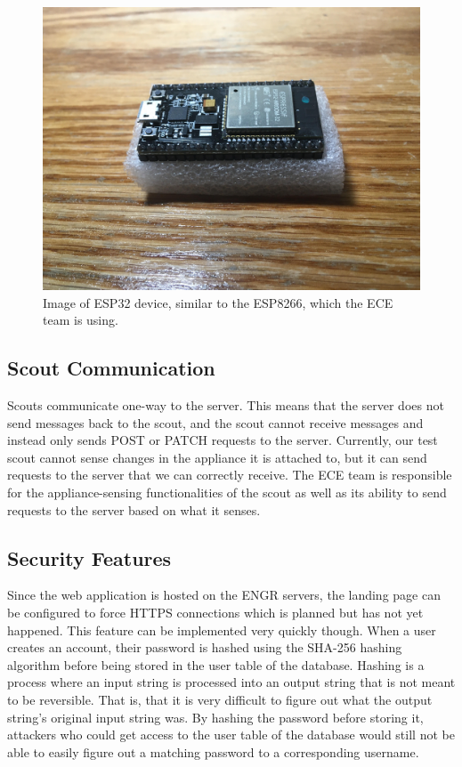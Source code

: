 \documentclass[onecolumn, draftclsnofoot,10pt, compsoc]{IEEEtran}
\begin{document}
\begin{figure}
    \centering
    \includegraphics[width = \textwidth]{unnamed.jpg}
    \caption{Image of ESP32 device, similar to the ESP8266, which the ECE team is using.}
\end{figure}

\subsection{Scout Communication}
Scouts communicate one-way to the server. This means that the server does not send messages back to the scout, and the scout cannot receive messages and instead only sends POST or PATCH requests to the server. Currently, our test scout cannot sense changes in the appliance it is attached to, but it can send requests to the server that we can correctly receive. The ECE team is responsible for the appliance-sensing functionalities of the scout as well as its ability to send requests to the server based on what it senses. 

\subsection{Security Features}
Since the web application is hosted on the ENGR servers, the landing page can be configured to force HTTPS connections which is planned but has not yet happened. This feature can be implemented very quickly though. When a user creates an account, their password is hashed using the SHA-256 hashing algorithm before being stored in the user table of the database. Hashing is a process where an input string is processed into an output string that is not meant to be reversible. That is, that it is very difficult to figure out what the output string's original input string was. By hashing the password before storing it, attackers who could get access to the user table of the database would still not be able to easily figure out a matching password to a corresponding username. 
\end{document}

